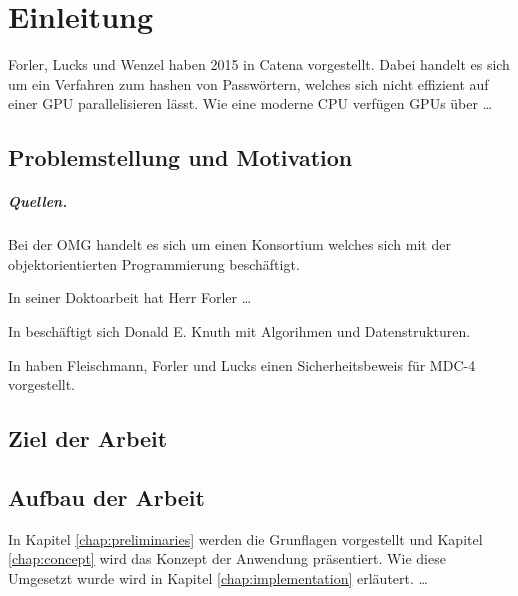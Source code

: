 \chapter{Einleitung}\label{chap:introduction}

Forler, Lucks und Wenzel haben 2015 in \cite{PHC:Catena:2015} Catena
vorgestellt. Dabei handelt es sich um ein Verfahren zum hashen von
Passwörtern, welches sich nicht effizient auf einer \ac{GPU}
parallelisieren lässt. Wie eine moderne \ac{CPU} verfügen \acp{GPU}
über \ldots


\section{Problemstellung und Motivation}

\lipsum[1-2]

\paragraph{Quellen.} 
Bei der \ac{OMG} handelt es sich um einen Konsortium welches sich mit
der objektorientierten Programmierung beschäftigt.\cite{OMG2020}

In seiner Doktoarbeit \cite{DBLP:phd/dnb/Forler15} hat Herr Forler
\ldots


In \cite{knuth97} beschäftigt sich Donald E. Knuth mit Algorihmen und
Datenstrukturen.


In \cite{DBLP:conf/africacrypt/FleischmannFL12} haben Fleischmann,
Forler und Lucks einen Sicherheitsbeweis für MDC-4 vorgestellt.


\section{Ziel der Arbeit}



\section{Aufbau der Arbeit}

In Kapitel \ref{chap:preliminaries} werden die Grunflagen vorgestellt
und Kapitel \ref{chap:concept} wird das Konzept der Anwendung
präsentiert. Wie diese Umgesetzt wurde wird in Kapitel
\ref{chap:implementation} erläutert. \ldots
